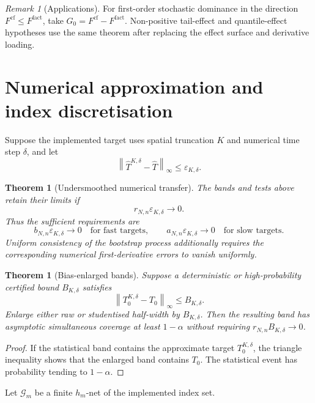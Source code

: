 \documentclass[11pt]{article}
\newtheorem{theorem}[assumption]{Theorem}
\theoremstyle{remark}
\newtheorem{remark}[assumption]{Remark}
\newcommand{\cf}{\mathrm{cf}}
\newcommand{\fact}{\mathrm{fact}}
\newcommand{\cG}{\mathcal G}
\newcommand{\norm}[1]{\left\lVert #1\right\rVert}
\newcommand{\an}{a_{N,n}}
\newcommand{\bn}{b_{N,n}}
\begin{document}
\begin{remark}[Applications]
For first-order stochastic dominance in the direction
$F^{\cf}\le F^{\fact}$, take $G_0=F^{\cf}-F^{\fact}$. Non-positive tail-effect and quantile-effect hypotheses use the same theorem after replacing the effect surface and derivative loading.
\end{remark}

\section{Numerical approximation and index discretisation}

Suppose the implemented target uses spatial truncation $K$ and numerical time step $\delta$, and let
\begin{equation}\label{eq:eps}
 \norm{\widehat T^{K,\delta}-\widehat T}_\infty
 \le\varepsilon_{K,\delta}.
\end{equation}

\begin{theorem}[Undersmoothed numerical transfer]\label{thm:undersmooth}
The bands and tests above retain their limits if
\[
 r_{N,n}\varepsilon_{K,\delta}\to0.
\]
Thus the sufficient requirements are
\[
 \bn\varepsilon_{K,\delta}\to0
 \quad\text{for fast targets},
 \qquad
 \an\varepsilon_{K,\delta}\to0
 \quad\text{for slow targets}.
\]
Uniform consistency of the bootstrap process additionally requires the corresponding numerical first-derivative errors to vanish uniformly.
\end{theorem}

\begin{theorem}[Bias-enlarged bands]\label{thm:bias-aware}
Suppose a deterministic or high-probability certified bound $B_{K,\delta}$ satisfies
\[
 \norm{T^{K,\delta}_0-T_0}_\infty\le B_{K,\delta}.
\]
Enlarge either raw or studentised half-width by $B_{K,\delta}$. Then the resulting band has asymptotic simultaneous coverage at least $1-\alpha$ without requiring $r_{N,n}B_{K,\delta}\to0$.
\end{theorem}

\begin{proof}
If the statistical band contains the approximate target $T_0^{K,\delta}$, the triangle inequality shows that the enlarged band contains $T_0$. The statistical event has probability tending to $1-\alpha$.
\end{proof}

Let $\cG_m$ be a finite $h_m$-net of the implemented index set.
\end{document}
